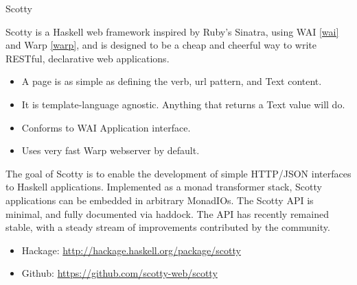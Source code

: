 \begin{hcarentry}[new]{Scotty}
\label{Scotty}
\makeheader

Scotty is a Haskell web framework inspired by Ruby's Sinatra, using WAI \cref{wai} and Warp \cref{warp},
and is designed to be a cheap and cheerful way to write RESTful, declarative web applications.

\begin{itemize}
\item A page is as simple as defining the verb, url pattern, and Text content.
\item It is template-language agnostic. Anything that returns a Text value will do.
\item Conforms to WAI Application interface.
\item Uses very fast Warp webserver by default.
\end{itemize}

The goal of Scotty is to enable the development of simple HTTP/JSON interfaces
to Haskell applications. Implemented as a monad transformer stack, Scotty applications
can be embedded in arbitrary MonadIOs. The Scotty API is minimal, and fully documented via haddock.
The API has recently remained stable, with a steady stream of improvements contributed
by the community.

\FurtherReading
  \begin{itemize}
  \item Hackage: \url{http://hackage.haskell.org/package/scotty}
  \item Github: \url{https://github.com/scotty-web/scotty}
  \end{itemize}
\end{hcarentry}
